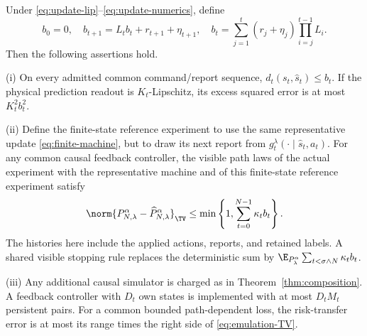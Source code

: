 \begin{theorem}\label{thm:emulation}
Under \eqref{eq:update-lip}--\eqref{eq:update-numerics}, define
\begin{equation}\label{eq:error-b}
 b_0=0,\quad b_{t+1}=L_tb_t+r_{t+1}+\eta_{t+1},\quad
 b_t=\sum_{j=1}^t(r_j+\eta_j)\prod_{i=j}^{t-1}L_i.
\end{equation}
Then the following assertions hold.

\textup{(i)} On every admitted common command/report sequence,
$d_t(s_t,\hat s_t)\le b_t$. If the physical prediction readout is
$K_t$-Lipschitz, its excess squared error is at most $K_t^2b_t^2$.

\textup{(ii)} Define the finite-state reference experiment to use the same
representative update \eqref{eq:finite-machine}, but to draw its next
report from $g_t^\lambda(\cdot\mid\hat s_t,a_t)$. For any common causal
feedback controller, the visible path laws of the actual experiment with
the representative machine and of this finite-state reference experiment
satisfy
\begin{equation}\label{eq:emulation-TV}
 \norm{P_{N,\lambda}^{\alpha}-\widehat P_{N,\lambda}^{\alpha}}_{\TV}
 \le \min\left\{1,\sum_{t=0}^{N-1}\kappa_tb_t\right\}.
\end{equation}
The histories here include the applied actions, reports, and retained
labels. A shared visible stopping rule replaces the deterministic sum by
$\E_{P^\alpha_\lambda}\sum_{t<\sigma\wedge N}\kappa_tb_t$.

\textup{(iii)} Any additional causal simulator is charged as in
Theorem~\ref{thm:composition}. A feedback controller with $D_t$ own states
is implemented with at most $D_tM_t$ persistent pairs. For a common bounded
path-dependent loss, the risk-transfer error is at most its range times the
right side of \eqref{eq:emulation-TV}.
\end{theorem}
